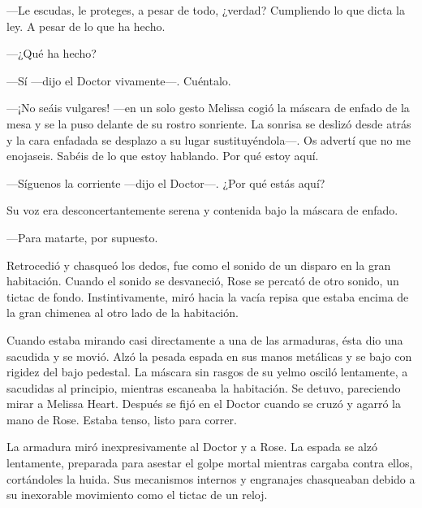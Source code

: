 {---Le escudas, le proteges, a pesar de todo, ¿verdad? Cumpliendo lo
que dicta la ley. A pesar de lo que ha hecho.}

{---¿Qué ha hecho?}

{---Sí ---dijo el Doctor vivamente---. Cuéntalo.}

{---¡No seáis vulgares! ---en un solo gesto Melissa cogió la máscara de
	enfado de la mesa y se la puso delante de su rostro sonriente. La
	sonrisa se deslizó desde atrás y la cara enfadada se desplazo a su lugar
	sustituyéndola---. Os advertí que no me enojaseis. Sabéis de lo que
estoy hablando. Por qué estoy aquí.}

{---Síguenos la corriente ---dijo el Doctor---. ¿Por qué estás aquí?}

{Su voz era desconcertantemente serena y contenida bajo la máscara de
enfado. }

{---Para matarte, por supuesto.}

{Retrocedió y chasqueó los dedos, fue como el sonido de un disparo en la
	gran habitación. Cuando el sonido se desvaneció, Rose se percató de otro
	sonido, un tictac de fondo. Instintivamente, miró hacia la vacía repisa
que estaba encima de la gran chimenea al otro lado de la habitación.}

{Cuando estaba mirando casi directamente a una de las armaduras, ésta
	dio una sacudida y se movió. Alzó la pesada espada en sus manos
	metálicas y se bajo con rigidez del bajo pedestal. La máscara sin rasgos
	de su yelmo osciló lentamente, a sacudidas al principio, mientras
	escaneaba la habitación. Se detuvo, pareciendo mirar a Melissa Heart.
	Después se fijó en el Doctor cuando se cruzó y agarró la mano de Rose.
Estaba tenso, listo para correr.}

{La armadura miró inexpresivamente al Doctor y a Rose. La espada se alzó
	lentamente, preparada para asestar el golpe mortal mientras cargaba
	contra ellos, cortándoles la huida. Sus mecanismos internos y engranajes
	chasqueaban debido a su inexorable movimiento como el tictac de un
reloj.}
